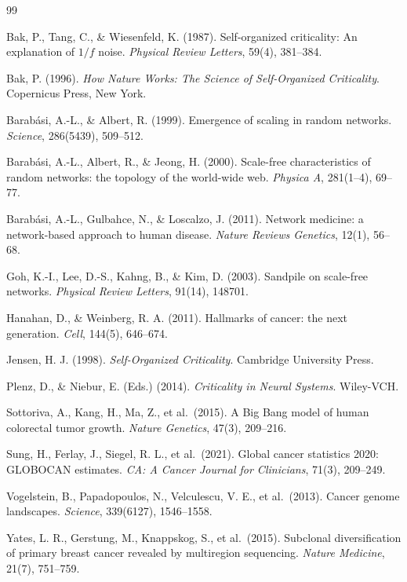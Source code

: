 \documentclass[12pt,a4paper]{article}
\begin{document}

\begin{thebibliography}{99}

Bak, P., Tang, C., \& Wiesenfeld, K. (1987).
Self-organized criticality: An explanation of $1/f$ noise.
\textit{Physical Review Letters}, 59(4), 381--384.

Bak, P. (1996).
\textit{How Nature Works: The Science of Self-Organized Criticality}.
Copernicus Press, New York.

Barab\'{a}si, A.-L., \& Albert, R. (1999).
Emergence of scaling in random networks.
\textit{Science}, 286(5439), 509--512.

Barab\'{a}si, A.-L., Albert, R., \& Jeong, H. (2000).
Scale-free characteristics of random networks: the topology of the world-wide web.
\textit{Physica A}, 281(1--4), 69--77.

Barab\'{a}si, A.-L., Gulbahce, N., \& Loscalzo, J. (2011).
Network medicine: a network-based approach to human disease.
\textit{Nature Reviews Genetics}, 12(1), 56--68.

Goh, K.-I., Lee, D.-S., Kahng, B., \& Kim, D. (2003).
Sandpile on scale-free networks.
\textit{Physical Review Letters}, 91(14), 148701.

Hanahan, D., \& Weinberg, R. A. (2011).
Hallmarks of cancer: the next generation.
\textit{Cell}, 144(5), 646--674.

Jensen, H. J. (1998).
\textit{Self-Organized Criticality}.
Cambridge University Press.

Plenz, D., \& Niebur, E. (Eds.) (2014).
\textit{Criticality in Neural Systems}.
Wiley-VCH.

Sottoriva, A., Kang, H., Ma, Z., et al.\ (2015).
A Big Bang model of human colorectal tumor growth.
\textit{Nature Genetics}, 47(3), 209--216.

Sung, H., Ferlay, J., Siegel, R. L., et al.\ (2021).
Global cancer statistics 2020: GLOBOCAN estimates.
\textit{CA: A Cancer Journal for Clinicians}, 71(3), 209--249.

Vogelstein, B., Papadopoulos, N., Velculescu, V. E., et al.\ (2013).
Cancer genome landscapes.
\textit{Science}, 339(6127), 1546--1558.

Yates, L. R., Gerstung, M., Knappskog, S., et al.\ (2015).
Subclonal diversification of primary breast cancer revealed by multiregion
sequencing.
\textit{Nature Medicine}, 21(7), 751--759.

\end{thebibliography}
\end{document}
